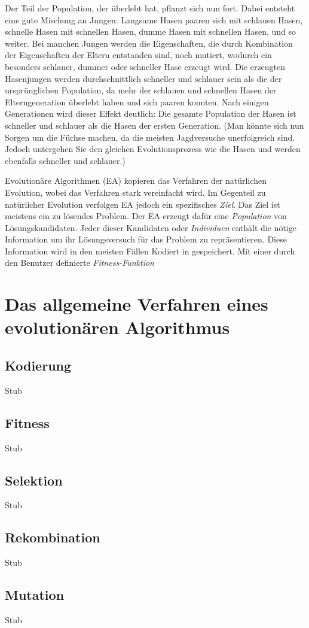 Der Teil der Population, der überlebt hat, pflanzt sich nun fort. Dabei entsteht eine gute Mischung an Jungen: Langsame Hasen paaren sich mit schlauen Hasen, schnelle Hasen mit schnellen Hasen, dumme Hasen mit schnellen Hasen, und so weiter. Bei manchen Jungen werden die Eigenschaften, die durch Kombination der Eigenschaften der Eltern entstanden sind, noch mutiert, wodurch ein besonders schlauer, dummer oder schneller Hase erzeugt wird. Die erzeugten Hasenjungen werden durchschnittlich schneller und schlauer sein als die der ursprünglichen Population, da mehr der schlauen und schnellen Hasen der Elterngeneration überlebt haben und sich paaren konnten. Nach einigen Generationen wird dieser Effekt deutlich: Die gesamte Population der Hasen ist schneller und schlauer als die Hasen der ersten Generation. (Man könnte sich nun Sorgen um die Füchse machen, da die meisten Jagdversuche unerfolgreich sind. Jedoch untergehen Sie den gleichen Evolutionsprozess wie die Hasen und werden ebenfalls schneller und schlauer.)

Evolutionäre Algorithmen (EA) kopieren das Verfahren der natürlichen Evolution, wobei das Verfahren stark vereinfacht wird. Im Gegenteil zu natürlicher Evolution verfolgen EA jedoch ein spezifisches \textit{Ziel}. Das Ziel ist meistens ein zu lösendes Problem. Der EA erzeugt dafür eine \textit{Population} von Lösungskandidaten. Jeder dieser Kandidaten oder \textit{Individuen} enthält die nötige Information um ihr Lösungsversuch für das Problem zu repräsentieren. Diese Information wird in den meisten Fällen Kodiert in  gespeichert. Mit einer durch den Benutzer definierte \textit{Fitness-Funktion}








\section{Das allgemeine Verfahren eines evolutionären Algorithmus}


\subsection{Kodierung}
Stub

\subsection{Fitness}
Stub

\subsection{Selektion}
Stub

\subsection{Rekombination}
Stub

\subsection{Mutation}
Stub
